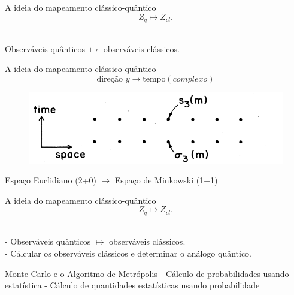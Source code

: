 \documentclass[10pt]{beamer}
\begin{document}
\begin{frame}{A ideia do mapeamento clássico-quântico}
	$$Z_q \mapsto Z_{cl}. $$
	\\
	\begin{center}
		Observáveis quânticos $\mapsto$ observáveis clássicos.
	\end{center}
\end{frame}

\begin{frame}{A ideia do mapeamento clássico-quântico}
	$$\text{direção } y \to \text{tempo} (complexo) $$
	\begin{figure}[h]
		\center
		\includegraphics[scale=.3]{2dmapping.png}
	\end{figure}
	\begin{center}
		Espaço Euclidiano (2+0) $\mapsto$ Espaço de Minkowski (1+1)
	\end{center}
	
\end{frame}


	
\begin{frame}{A ideia do mapeamento clássico-quântico}
	$$Z_q \mapsto Z_{cl}. $$
	\\
	\begin{center}
		- Observáveis quânticos $\mapsto$ observáveis clássicos.\\
		- Cálcular os observáveis clássicos e determinar o análogo quântico. 
	\end{center}
\end{frame}


\begin{frame}{Monte Carlo e o Algoritmo de Metrópolis}
	- Cálculo de probabilidades usando estatística
	- Cálculo de quantidades estatísticas usando probabilidade	
\end{frame}
\end{document}
